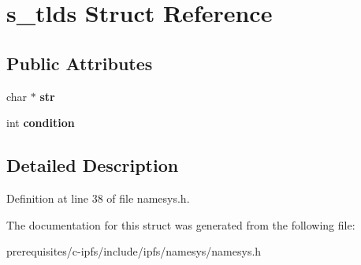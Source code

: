 \hypertarget{structs__tlds}{}\section{s\+\_\+tlds Struct Reference}
\label{structs__tlds}
\subsection*{Public Attributes}
\begin{DoxyCompactItemize}
\item 
\mbox{\label{structs__tlds_aa2bc41a9690a3bd9117242ac759d27d2}} 
char $\ast$ {\bfseries str}
\item 
\mbox{\label{structs__tlds_a34e903c51284e523b0a2488969c336eb}} 
int {\bfseries condition}
\end{DoxyCompactItemize}


\subsection{Detailed Description}


Definition at line 38 of file namesys.\+h.



The documentation for this struct was generated from the following file\+:\begin{DoxyCompactItemize}
\item 
prerequisites/c-\/ipfs/include/ipfs/namesys/namesys.\+h\end{DoxyCompactItemize}
